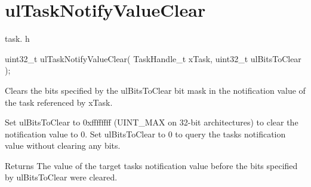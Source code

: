 \hypertarget{group__ul_task_notify_value_clear}{}\section{ul\+Task\+Notify\+Value\+Clear}
\label{group__ul_task_notify_value_clear}
task. h 
\begin{DoxyPre}uint32\_t ulTaskNotifyValueClear( TaskHandle\_t xTask, uint32\_t ulBitsToClear );\end{DoxyPre}


Clears the bits specified by the ul\+Bits\+To\+Clear bit mask in the notification value of the task referenced by x\+Task.

Set ul\+Bits\+To\+Clear to 0xffffffff (U\+I\+N\+T\+\_\+\+M\+AX on 32-\/bit architectures) to clear the notification value to 0. Set ul\+Bits\+To\+Clear to 0 to query the task\textquotesingle{}s notification value without clearing any bits.

\begin{DoxyReturn}{Returns}
The value of the target task\textquotesingle{}s notification value before the bits specified by ul\+Bits\+To\+Clear were cleared. 
\end{DoxyReturn}
